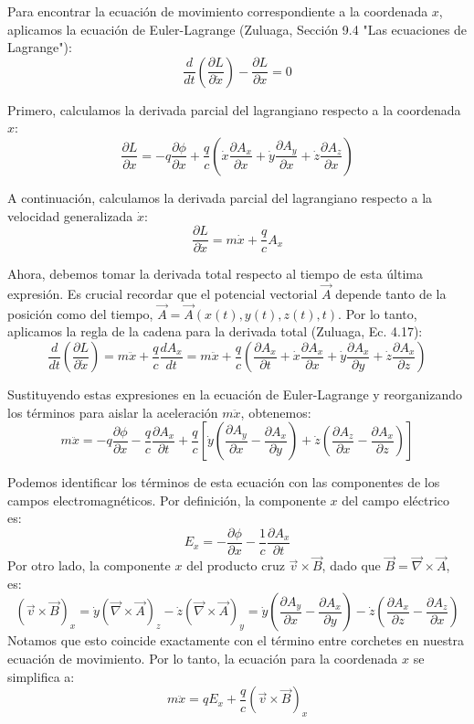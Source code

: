 \documentclass[a4paper]{article}
\begin{document}
Para encontrar la ecuación de movimiento correspondiente a la coordenada $x$, aplicamos la ecuación de Euler-Lagrange (Zuluaga, Sección 9.4 "Las ecuaciones de Lagrange"):
$$\frac{d}{dt}\left(\frac{\partial L}{\partial \dot{x}}\right) - \frac{\partial L}{\partial x} = 0$$

Primero, calculamos la derivada parcial del lagrangiano respecto a la coordenada $x$:
$$\frac{\partial L}{\partial x} = -q\frac{\partial \phi}{\partial x} + \frac{q}{c}\left(\dot{x}\frac{\partial A_x}{\partial x} + \dot{y}\frac{\partial A_y}{\partial x} + \dot{z}\frac{\partial A_z}{\partial x}\right)$$

A continuación, calculamos la derivada parcial del lagrangiano respecto a la velocidad generalizada $\dot{x}$:
$$\frac{\partial L}{\partial \dot{x}} = m\dot{x} + \frac{q}{c}A_x$$

Ahora, debemos tomar la derivada total respecto al tiempo de esta última expresión. Es crucial recordar que el potencial vectorial $\vec{A}$ depende tanto de la posición como del tiempo, $\vec{A} = \vec{A}(x(t), y(t), z(t), t)$. Por lo tanto, aplicamos la regla de la cadena para la derivada total (Zuluaga, Ec. 4.17):
$$\frac{d}{dt}\left(\frac{\partial L}{\partial \dot{x}}\right) = m\ddot{x} + \frac{q}{c}\frac{d A_x}{dt} = m\ddot{x} + \frac{q}{c}\left( \frac{\partial A_x}{\partial t} + \dot{x}\frac{\partial A_x}{\partial x} + \dot{y}\frac{\partial A_x}{\partial y} + \dot{z}\frac{\partial A_x}{\partial z} \right)$$

Sustituyendo estas expresiones en la ecuación de Euler-Lagrange y reorganizando los términos para aislar la aceleración $m\ddot{x}$, obtenemos:
$$m\ddot{x} = -q\frac{\partial \phi}{\partial x} - \frac{q}{c}\frac{\partial A_x}{\partial t} + \frac{q}{c}\left[ \dot{y}\left(\frac{\partial A_y}{\partial x} - \frac{\partial A_x}{\partial y}\right) + \dot{z}\left(\frac{\partial A_z}{\partial x} - \frac{\partial A_x}{\partial z}\right) \right]$$

Podemos identificar los términos de esta ecuación con las componentes de los campos electromagnéticos. Por definición, la componente $x$ del campo eléctrico es:
$$E_x = -\frac{\partial \phi}{\partial x} - \frac{1}{c}\frac{\partial A_x}{\partial t}$$
Por otro lado, la componente $x$ del producto cruz $\vec{v} \times \vec{B}$, dado que $\vec{B} = \vec{\nabla} \times \vec{A}$, es:
$$(\vec{v} \times \vec{B})_x = \dot{y}(\vec{\nabla} \times \vec{A})_z - \dot{z}(\vec{\nabla} \times \vec{A})_y = \dot{y}\left(\frac{\partial A_y}{\partial x} - \frac{\partial A_x}{\partial y}\right) - \dot{z}\left(\frac{\partial A_x}{\partial z} - \frac{\partial A_z}{\partial x}\right)$$
Notamos que esto coincide exactamente con el término entre corchetes en nuestra ecuación de movimiento. Por lo tanto, la ecuación para la coordenada $x$ se simplifica a:
$$m\ddot{x} = qE_x + \frac{q}{c}(\vec{v} \times \vec{B})_x$$
\end{document}
